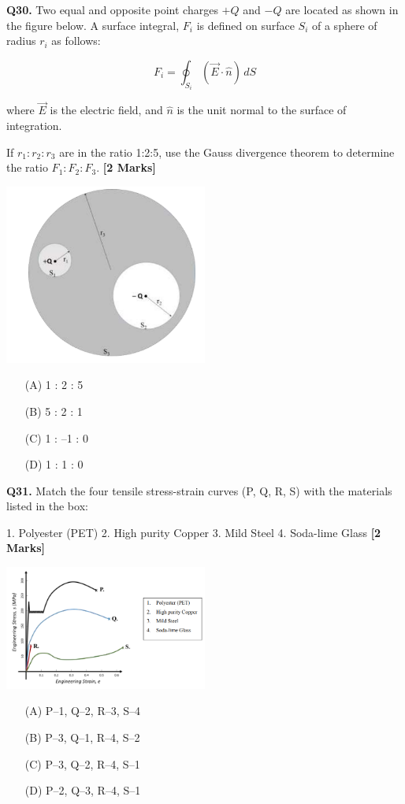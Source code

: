 \documentclass[11pt]{article}
\newcommand{\questionb}[2]{
    \noindent\textbf{Q#2.} #1 \hfill \textbf{[2 Marks]}
}
\begin{document}
\questionb{Two equal and opposite point charges \(+Q\) and \(-Q\) are located as shown in the figure below. A surface integral, \(F_i\) is defined on surface \(S_i\) of a sphere of radius \(r_i\) as follows:  

\[
F_i = \oint_{S_i} (\vec{E} \cdot \hat{n})\, dS
\]

where \(\vec{E}\) is the electric field, and \(\hat{n}\) is the unit normal to the surface of integration.  

If \(r_1 : r_2 : r_3\) are in the ratio 1:2:5, use the Gauss divergence theorem to determine the ratio \(F_1 : F_2 : F_3\).}{30}
\begin{center}
\includegraphics[width=0.5\textwidth]{figures/30.png}
\end{center}
\begin{enumerate}
    \item[(A)] 1 : 2 : 5  
    \item[(B)] 5 : 2 : 1  
    \item[(C)] 1 : –1 : 0  
    \item[(D)] 1 : 1 : 0  
\end{enumerate}
\vspace{0.5cm}

\questionb{Match the four tensile stress-strain curves (P, Q, R, S) with the materials listed in the box:  

1. Polyester (PET)  
2. High purity Copper  
3. Mild Steel  
4. Soda-lime Glass}{31}
\begin{center}
\includegraphics[width=0.5\textwidth]{figures/31.png}
\end{center}
\begin{enumerate}
    \item[(A)] P–1, Q–2, R–3, S–4  
    \item[(B)] P–3, Q–1, R–4, S–2  
    \item[(C)] P–3, Q–2, R–4, S–1  
    \item[(D)] P–2, Q–3, R–4, S–1  
\end{enumerate}
\vspace{0.5cm}
\end{document}
